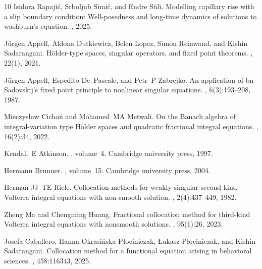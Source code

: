 \documentclass[12pt,a4paper]{article}
\begin{document}
\begin{thebibliography}{10}
	Isidora Rapaji{\'c}, Srboljub Simi{\'c}, and Endre S{\"u}li.
	\newblock Modelling capillary rise with a slip boundary condition:
	Well-posedness and long-time dynamics of solutions to washburn's equation.
	, 2025.
	
	J{\"u}rgen Appell, Aldona Dutkiewicz, Belen Lopez, Simon Reinwand, and Kishin
	Sadarangani.
	\newblock H{\"o}lder-type spaces, singular operators, and fixed point theorems.
	, 22(1), 2021.
	
	J{\"u}rgen Appell, Espedito De~Pascale, and Petr~P Zabrejko.
	\newblock An application of bn {S}adovskij’s fixed point principle to
	nonlinear singular equations.
	,
	6(3):193--208, 1987.
	
	Mieczys{\l}aw Cicho{\'n} and Mohamed~MA Metwali.
	\newblock On the {B}anach algebra of integral-variation type {H}{\"o}lder
	spaces and quadratic fractional integral equations.
	, 16(2):34, 2022.
	
	Kendall~E Atkinson.
	, volume~4.
	\newblock Cambridge university press, 1997.
	
	Hermann Brunner.
	, volume~15.
	\newblock Cambridge university press, 2004.
	
	Herman JJ~TE Riele.
	\newblock Collocation methods for weakly singular second-kind {V}olterra
	integral equations with non-smooth solution.
	, 2(4):437--449, 1982.
	
	Zheng Ma and Chengming Huang.
	\newblock Fractional collocation method for third-kind {V}olterra integral
	equations with nonsmooth solutions.
	, 95(1):26, 2023.
	
	Josefa Caballero, Hanna Okrasi{\'n}ska-P{\l}ociniczak, {\L}ukasz
	P{\l}ociniczak, and Kishin Sadarangani.
	\newblock Collocation method for a functional equation arising in behavioral
	sciences.
	, 458:116343,
	2025.
	

\end{thebibliography}
\end{document}
